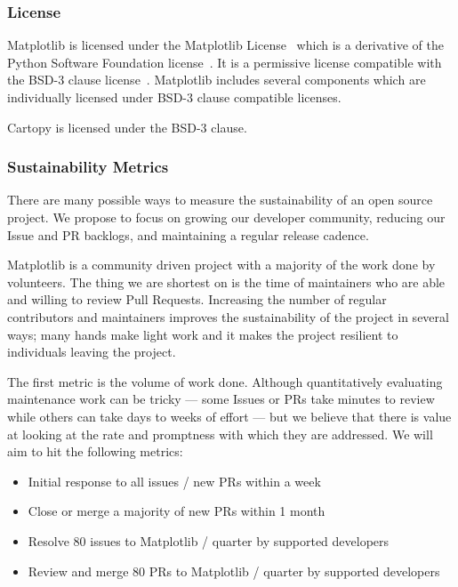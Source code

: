 \documentclass[12pt]{article}
\numberwithin{page}{section}
\begin{document}
\subsubsection{License}

Matplotlib is licensed under the Matplotlib License~\cite{mpl_lic} which is a
derivative of the Python Software Foundation license~\cite{psf_lic}.  It is a
permissive license compatible with the BSD-3 clause
license~\cite{jdh_bsd_opinions}.  Matplotlib includes several components which
are individually licensed under BSD-3 clause compatible licenses.

Cartopy is licensed under the BSD-3 clause.


\subsubsection{Sustainability Metrics}

There are many possible ways to measure the sustainability of an
open source project.  We propose to focus on growing our developer
community, reducing our Issue and PR backlogs, and maintaining a
regular release cadence.

Matplotlib is a community driven project with a majority of the
work done by volunteers.  The thing we are shortest on is the time of
maintainers who are able and willing to review Pull Requests.
Increasing the number of regular contributors and maintainers improves
the sustainability of the project in several ways; many hands make
light work and it makes the project resilient to individuals leaving
the project.

The first metric is the volume of work done.  Although quantitatively
evaluating maintenance work can be tricky --- some Issues or PRs take minutes
to review while others can take days to weeks of effort --- but we believe that
there is value at looking at the rate and promptness with which they are
addressed.  We will aim to hit the following metrics:
\begin{itemize}[noitemsep]
\item Initial response to all issues / new PRs within a week  %
\item Close or merge a majority of new PRs within 1 month     %
\item Resolve 80 issues to Matplotlib / quarter by supported developers       %
\item Review and merge 80 PRs to Matplotlib / quarter by supported developers %
\end{itemize}
\end{document}
